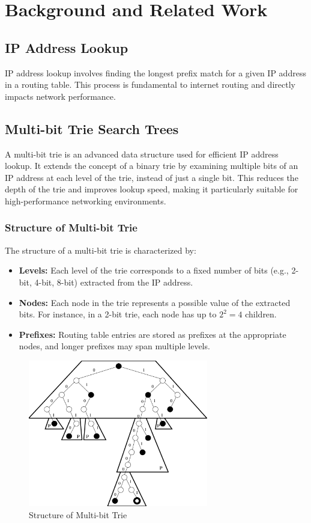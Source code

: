 \documentclass[12pt	]{article}
\begin{document}
\section{Background and Related Work}
\subsection{IP Address Lookup}
IP address lookup involves finding the longest prefix match for a given IP address in a routing table. This process is fundamental to internet routing and directly impacts network performance.

\subsection{Multi-bit Trie Search Trees}
A multi-bit trie is an advanced data structure used for efficient IP address lookup. It extends the concept of a binary trie by examining multiple bits of an IP address at each level of the trie, instead of just a single bit. This reduces the depth of the trie and improves lookup speed, making it particularly suitable for high-performance networking environments.

\subsubsection{Structure of Multi-bit Trie}
The structure of a multi-bit trie is characterized by:
\begin{itemize}
	\item \textbf{Levels:} Each level of the trie corresponds to a fixed number of bits (e.g., 2-bit, 4-bit, 8-bit) extracted from the IP address.
	\item \textbf{Nodes:} Each node in the trie represents a possible value of the extracted bits. For instance, in a 2-bit trie, each node has up to $2^2 = 4$ children.
	\item \textbf{Prefixes:} Routing table entries are stored as prefixes at the appropriate nodes, and longer prefixes may span multiple levels.
\end{itemize}


\begin{figure}[h!]
	\centering
	\includegraphics[width=0.7\textwidth]{Images/img3.png}
	\caption{Structure of Multi-bit Trie}
	\label{fig:Structure of Multi-bit Trie}
\end{figure}
\end{document}
